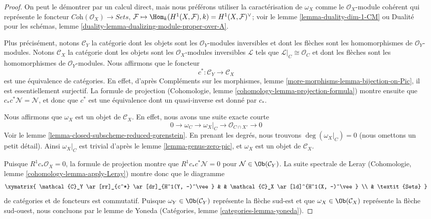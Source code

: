 \begin{proof}
On peut le démontrer par un calcul direct, mais nous préférons utiliser la caractérisation de $\omega_X$ comme le $\mathcal{O}_X$-module cohérent qui représente le foncteur $\textit{Coh}(\mathcal{O}_X) \to \textit{Sets}$, $\mathcal{F} \mapsto \Hom_k(H^1(X, \mathcal{F}), k) =
H^1(X, \mathcal{F})^\vee$; voir le lemme \ref{lemma-duality-dim-1-CM} ou Dualité pour les schémas, lemme \ref{duality-lemma-dualizing-module-proper-over-A}.

\medskip\noindent
Plus précisément, notons $\mathcal{C}_Y$ la catégorie dont les objets sont les $\mathcal{O}_Y$-modules inversibles et dont les flèches sont les homomorphismes de $\mathcal{O}_Y$-modules. Notons $\mathcal{C}_X$ la catégorie dont les objets sont les $\mathcal{O}_X$-modules inversibles $\mathcal{L}$ tels que $\mathcal{L}|_C \cong \mathcal{O}_C$ et dont les flèches sont les homomorphismes de $\mathcal{O}_Y$-modules. Nous affirmons que le foncteur $$
c^* : \mathcal{C}_Y \to \mathcal{C}_X
$$ est une équivalence de catégories. En effet, d'après Compléments sur les morphismes, lemme \ref{more-morphisms-lemma-bijection-on-Pic}, il est essentiellement surjectif. La formule de projection (Cohomologie, lemme \ref{cohomology-lemma-projection-formula}) montre ensuite que $c_*c^*\mathcal{N} = \mathcal{N}$, et donc que $c^*$ est une équivalence dont un quasi-inverse est donné par $c_*$.

\medskip\noindent
Nous affirmons que $\omega_X$ est un objet de $\mathcal{C}_X$. En effet, nous avons une suite exacte courte $$
0 \to \omega_C \to \omega_X|_C \to \mathcal{O}_{C \cap X'} \to 0
$$ Voir le lemme \ref{lemma-closed-subscheme-reduced-gorenstein}. En prenant les degrés, nous trouvons $\deg(\omega_X|_C) = 0$ (nous omettons un petit détail). Ainsi $\omega_X|_C$ est trivial d'après le lemme \ref{lemma-genus-zero-pic}, et $\omega_X$ est un objet de $\mathcal{C}_X$.

\medskip\noindent
Puisque $R^1c_*\mathcal{O}_X = 0$, la formule de projection montre que $R^1c_*c^*\mathcal{N} = 0$ pour $\mathcal{N} \in \Ob(\mathcal{C}_Y)$. La suite spectrale de Leray (Cohomologie, lemme \ref{cohomology-lemma-apply-Leray}) montre donc que le diagramme $$
\xymatrix{
\mathcal{C}_Y \ar[rr]_{c^*} \ar[dr]_{H^1(Y, -)^\vee} & &
\mathcal{C}_X \ar[ld]^{H^1(X, -)^\vee} \\
& \textit{Sets}
}
$$ de catégories et de foncteurs est commutatif. Puisque $\omega_Y \in \Ob(\mathcal{C}_Y)$ représente la flèche sud-est et que $\omega_X \in \Ob(\mathcal{C}_X)$ représente la flèche sud-ouest, nous concluons par le lemme de Yoneda (Catégories, lemme \ref{categories-lemma-yoneda}).
\end{proof}

